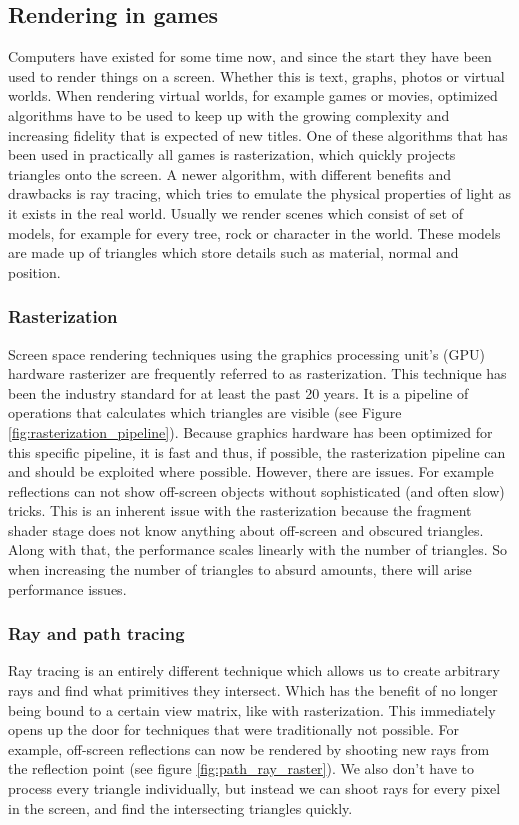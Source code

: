 \subsection{Rendering in games} \label{related_work:rendering}
Computers have existed for some time now, and since the start they have been used to render things on a screen. Whether this is text, graphs, photos or virtual worlds. When rendering virtual worlds, for example games or movies, optimized algorithms have to be used to keep up with the growing complexity and increasing fidelity that is expected of new titles. One of these algorithms that has been used in practically all games is rasterization, which quickly projects triangles onto the screen. A newer algorithm, with different benefits and drawbacks is ray tracing, which tries to emulate the physical properties of light as it exists in the real world. Usually we render scenes which consist of set of models, for example for every tree, rock or character in the world. These models are made up of triangles which store details such as material, normal and position.


\subsubsection{Rasterization} \label{related_work:rendering:rasterization}
Screen space rendering techniques using the graphics processing unit's (GPU) hardware rasterizer are frequently referred to as rasterization. This technique has been the industry standard for at least the past 20 years. It is a pipeline of operations that calculates which triangles are visible (see Figure \ref{fig:rasterization_pipeline}). Because graphics hardware has been optimized for this specific pipeline, it is fast and thus, if possible, the rasterization pipeline can and should be exploited where possible. However, there are issues. For example reflections can not show off-screen objects without sophisticated (and often slow) tricks. This is an inherent issue with the rasterization because the fragment shader stage does not know anything about off-screen and obscured triangles. Along with that, the performance scales linearly with the number of triangles. So when increasing the number of triangles to absurd amounts, there will arise performance issues.

\subsubsection{Ray and path tracing} \label{related_work:rendering:ray_tracing}
Ray tracing is an entirely different technique which allows us to create arbitrary rays and find what primitives they intersect. Which has the benefit of no longer being bound to a certain view matrix, like with rasterization. This immediately opens up the door for techniques that were traditionally not possible. For example, off-screen reflections can now be rendered by shooting new rays from the reflection point (see figure \ref{fig:path_ray_raster}). We also don't have to process every triangle individually, but instead we can shoot rays for every pixel in the screen, and find the intersecting triangles quickly.

